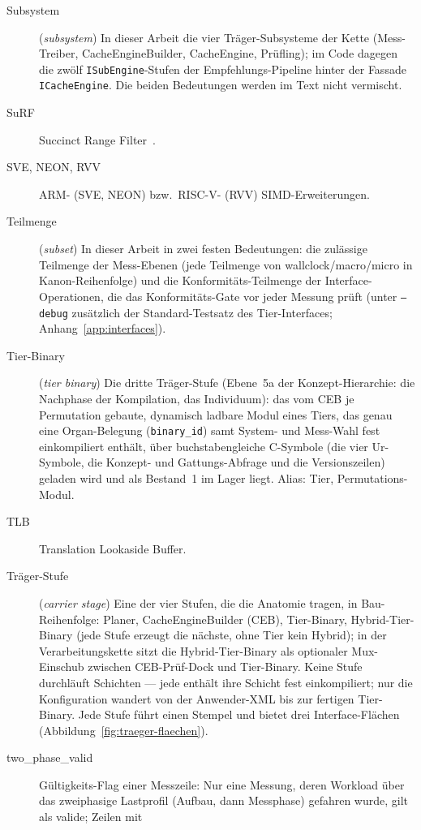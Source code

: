 \begin{description}
  \item[Subsystem] (\emph{subsystem}) In dieser Arbeit die vier Träger-Subsysteme der Kette
  (Mess-Treiber, CacheEngineBuilder, CacheEngine, Prüfling); im Code dagegen die zwölf
  \texttt{ISubEngine}-Stufen der Empfehlungs-Pipeline hinter der Fassade \texttt{ICacheEngine}.
  Die beiden Bedeutungen werden im Text nicht vermischt.
  \item[SuRF] Succinct Range Filter~\cite{zhang2018surf}.
  \item[SVE, NEON, RVV] ARM- (SVE, NEON) bzw.\ RISC-V- (RVV) SIMD-Erweiterungen.
  \item[Teilmenge] (\emph{subset}) In dieser Arbeit in zwei festen Bedeutungen: die zulässige
  Teilmenge der Mess-Ebenen (jede Teilmenge von wallclock/macro/micro in Kanon-Reihenfolge) und die
  Konformitäts-Teilmenge der Interface-Operationen, die das Konformitäts-Gate vor jeder Messung
  prüft (unter \texttt{--debug} zusätzlich der Standard-Testsatz des Tier-Interfaces; Anhang~\ref{app:interfaces}).
  \item[Tier-Binary] (\emph{tier binary}) Die dritte Träger-Stufe (Ebene~5a der Konzept-Hierarchie: die
  Nachphase der Kompilation, das Individuum): das vom CEB je Permutation
  gebaute, dynamisch ladbare Modul eines Tiers, das genau eine Organ-Belegung
  (\texttt{binary\_id}) samt System- und Mess-Wahl fest einkompiliert enthält, über buchstabengleiche
  C-Symbole (die vier Ur-Symbole, die Konzept- und Gattungs-Abfrage und die Versionszeilen) geladen
  wird und als Bestand~1 im Lager liegt. Alias: Tier, Permutations-Modul.
  \item[TLB] Translation Lookaside Buffer.
  \item[Träger-Stufe] (\emph{carrier stage}) Eine der vier Stufen, die die Anatomie tragen, in
  Bau-Reihenfolge: Planer, CacheEngineBuilder (CEB), Tier-Binary, Hybrid-Tier-Binary (jede Stufe erzeugt
  die nächste, ohne Tier kein Hybrid); in der Verarbeitungskette sitzt die Hybrid-Tier-Binary als optionaler
  Mux-Einschub zwischen CEB-Prüf-Dock und Tier-Binary. Keine
  Stufe durchläuft Schichten --- jede enthält ihre Schicht fest einkompiliert; nur die
  Konfiguration wandert von der Anwender-XML bis zur fertigen Tier-Binary. Jede Stufe führt einen
  Stempel und bietet drei Interface-Flächen (Abbildung~\ref{fig:traeger-flaechen}).
  \item[two\_phase\_valid] Gültigkeits-Flag einer Messzeile: Nur eine Messung, deren Workload über
  das zweiphasige Lastprofil (Aufbau, dann Messphase) gefahren wurde, gilt als valide; Zeilen mit

\end{description}

